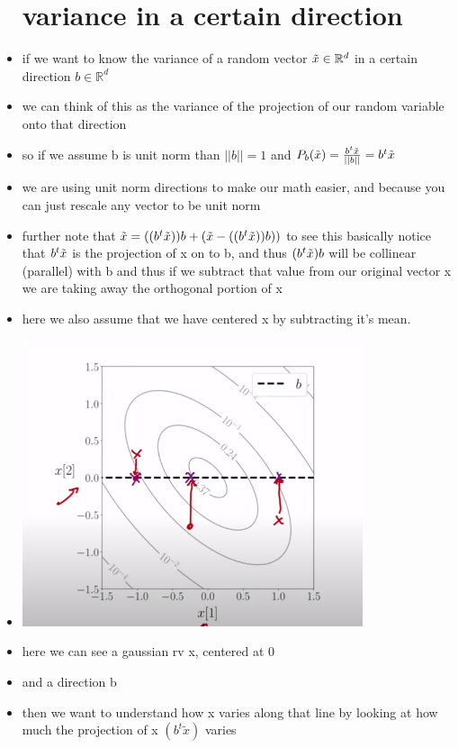 \documentclass{article}
\begin{document}
\begin{itemize}
\section{variance in a certain direction}
\item if we want to know the variance of a random vector $\Tilde{x}\in \mathbb{R}^{d}$ in a certain direction $b\in \mathbb{R}^{d}$
\item we can think of this  as the variance of  the projection of our random variable onto that direction
\item so if we assume b is unit norm  than $||b||=1$ and $P_{b}(\Tilde{x})=\frac{b^t\Tilde{x}}{||b||}=b^t\Tilde{x}$
\item we are using unit norm directions to make our math easier, and because you can just rescale any vector to be unit norm 
\item further note that $\Tilde{x}=((b^t\Tilde{x}))b+(\Tilde{x}-((b^t\Tilde{x}))b))$ to see this basically notice that $b^t\Tilde{x}$ is the projection of x on to b, and thus $(b^t\Tilde{x})b$ will be collinear (parallel) with b and thus if we subtract that value from our original vector x we are taking away the orthogonal portion of x
\item  here we also assume that we have centered x by subtracting it's mean. 
\item \includegraphics[width=10cm]{notes/week_8/vedio_1/images/v1_3.png}
\item  here we can see a gaussian rv x, centered at 0 
\item and a direction b
\item then we want to understand how x varies along that line by looking at how much the projection of x $(b^t\tilde{x})$ varies

\end{itemize}
\end{document}

